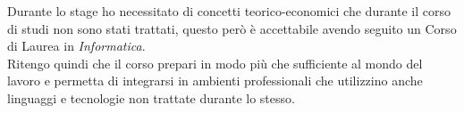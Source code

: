 Durante lo stage ho necessitato di concetti teorico-economici che durante il corso di studi non sono stati trattati, questo però è accettabile avendo seguito un Corso di Laurea in \textit{Informatica}.\\

Ritengo quindi che il corso prepari in modo più che sufficiente al mondo del lavoro e permetta di integrarsi in ambienti professionali che utilizzino anche linguaggi e tecnologie non trattate durante lo stesso.